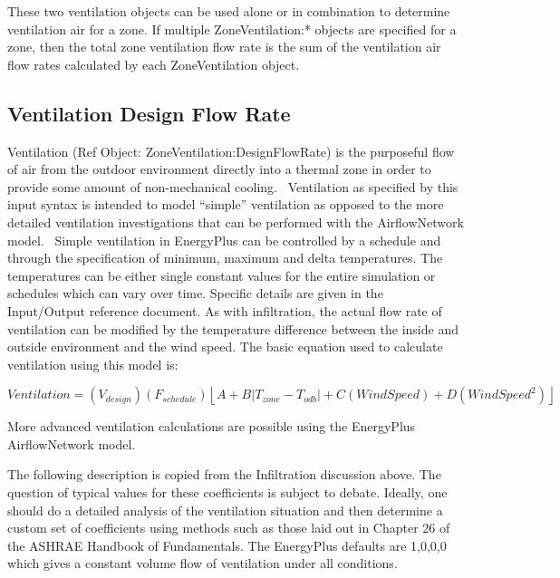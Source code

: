 These two ventilation objects can be used alone or in combination to determine ventilation air for a zone. If multiple ZoneVentilation:* objects are specified for a zone, then the total zone ventilation flow rate is the sum of the ventilation air flow rates calculated by each ZoneVentilation object.

\subsection{Ventilation Design Flow Rate}\label{ventilation-design-flow-rate}

Ventilation (Ref Object: ZoneVentilation:DesignFlowRate) is the purposeful flow of air from the outdoor environment directly into a thermal zone in order to provide some amount of non-mechanical cooling.~ Ventilation as specified by this input syntax is intended to model ``simple'' ventilation as opposed to the more detailed ventilation investigations that can be performed with the AirflowNetwork model.~ Simple ventilation in EnergyPlus can be controlled by a schedule and through the specification of minimum, maximum and delta temperatures. The temperatures can be either single constant values for the entire simulation or schedules which can vary over time. Specific details are given in the Input/Output reference document. As with infiltration, the actual flow rate of ventilation can be modified by the temperature difference between the inside and outside environment and the wind speed. The basic equation used to calculate ventilation using this model is:

\begin{equation}
Ventilation = \left( {{V_{design}}} \right)\left( {{F_{schedule}}} \right)\left\lfloor {A + B\left| {{T_{zone}} - {T_{odb}}} \right| + C\left( {WindSpeed} \right) + D\left( {WindSpee{d^2}} \right)} \right\rfloor
\end{equation}

More advanced ventilation calculations are possible using the EnergyPlus AirflowNetwork model.

The following description is copied from the Infiltration discussion above. The question of typical values for these coefficients is subject to debate. Ideally, one should do a detailed analysis of the ventilation situation and then determine a custom set of coefficients using methods such as those laid out in Chapter 26 of the ASHRAE Handbook of Fundamentals. The EnergyPlus defaults are 1,0,0,0 which gives a constant volume flow of ventilation under all conditions.

